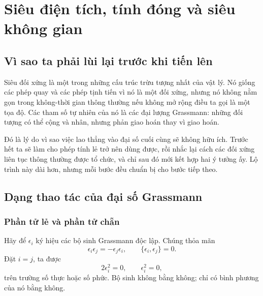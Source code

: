 \chapter{Siêu điện tích, tính đóng và siêu không gian}


\section{Vì sao ta phải lùi lại trước khi tiến lên}

Siêu đối xứng là một trong những cấu trúc trừu tượng nhất của vật lý. Nó giống các phép quay và các phép tịnh tiến vì nó là một đối xứng, nhưng nó không nằm gọn trong không-thời gian thông thường nếu không mở rộng điều ta gọi là một tọa độ. Các tham số tự nhiên của nó là các đại lượng Grassmann: những đối tượng có thể cộng và nhân, nhưng phản giao hoán thay vì giao hoán.

Đó là lý do vì sao việc lao thẳng vào đại số cuối cùng sẽ không hữu ích. Trước hết ta sẽ làm cho phép tính lẻ trở nên dùng được, rồi nhắc lại cách các đối xứng liên tục thông thường được tổ chức, và chỉ sau đó mới kết hợp hai ý tưởng ấy. Lộ trình này dài hơn, nhưng mỗi bước đều chuẩn bị cho bước tiếp theo.

\section{Dạng thao tác của đại số Grassmann}

\subsection{Phần tử lẻ và phần tử chẵn}

Hãy để \(\epsilon_i\) ký hiệu các bộ sinh Grassmann độc lập. Chúng thỏa mãn
\begin{equation}
\epsilon_i\epsilon_j=-\epsilon_j\epsilon_i,
\qquad
\{\epsilon_i,\epsilon_j\}=0.
\end{equation}
Đặt \(i=j\), ta được
\begin{equation}
2\epsilon_i^2=0,
\qquad
\epsilon_i^2=0,
\end{equation}
trên trường số thực hoặc số phức. Bộ sinh không bằng không; chỉ có bình phương của nó bằng không.

